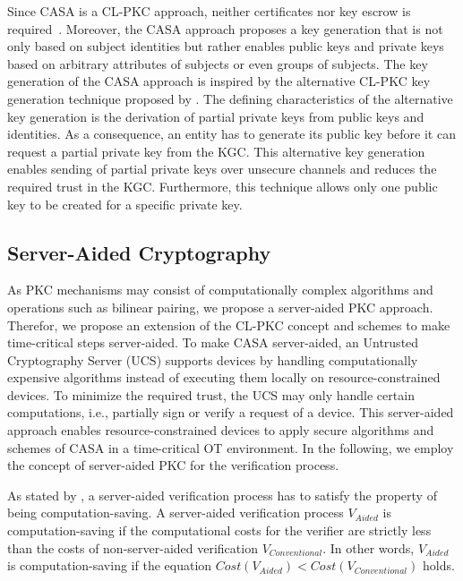 Since CASA is a CL-PKC approach, neither certificates nor key escrow is required~\cite{AlRiyami2003}.
Moreover, the CASA approach proposes a key generation that is not only based on subject identities but rather enables public keys and private keys based on arbitrary attributes of subjects or even groups of subjects.
The key generation of the CASA approach is inspired by the alternative CL-PKC key generation technique proposed by \citeauthor{AlRiyami2003} \cite{AlRiyami2003}.
The defining characteristics of the alternative key generation is the derivation of partial private keys from public keys and identities.
As a consequence, an entity has to generate its public key before it can request a partial private key from the KGC.
This alternative key generation enables sending of partial private keys over unsecure channels and reduces the required trust in the KGC.
Furthermore, this technique allows only one public key to be created for a specific private key.

\subsection{Server-Aided Cryptography}
As PKC mechanisms may consist of computationally complex algorithms and operations such as bilinear pairing, we propose a server-aided PKC approach.
Therefor, we propose an extension of the CL-PKC concept and schemes to make time-critical steps server-aided.
To make CASA server-aided, an Untrusted Cryptography Server (UCS) supports devices by handling computationally expensive algorithms instead of executing them locally on resource-constrained devices.
To minimize the required trust, the UCS may only handle certain computations, i.e., partially sign or verify a request of a device.
This server-aided approach enables resource-constrained devices to apply secure algorithms and schemes of CASA in a time-critical OT environment.
In the following, we employ the concept of server-aided PKC for the verification process.

As stated by \citeauthor{Wu2008} \cite{Wu2008}, a server-aided verification process has to satisfy the property of being computation-saving.
A server-aided verification process $V_{Aided}$ is computation-saving if the computational costs for the verifier are strictly less than the costs of non-server-aided verification $V_{Conventional}$.
In other words, $V_{Aided}$ is computation-saving if the equation $Cost(V_{Aided}) < Cost(V_{Conventional})$ holds.

